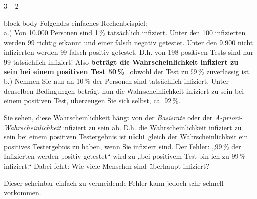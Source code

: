 \documentclass{beamer}
\begin{document}
\begin{frame}[t]
\begin{textblock*}{3\colwidth + 2\colsep}
\begin{alertblock}
\begin{minipage}{\textwidth}
\begin{beamercolorbox}[
			ht = 24.5cm, 
			wd = \linewidth, 
			left
		]{block body}
			\vspace{0.3cm}
		Folgendes einfaches Rechenbeispiel:\\
		a.)	Von 10.000 Personen sind 1\,\% tatsächlich infiziert. Unter den 100 infizierten werden 99 richtig erkannt und einer falsch negativ getestet. Unter den 9.900 nicht infizierten werden 99 falsch positiv getestet. D.h. von 198 positiven Tests sind nur 99 tatsächlich infiziert! Also \textbf{beträgt die Wahrscheinlichkeit infiziert zu sein bei einem positiven Test 50\,\%\ } obwohl der Test zu 99\,\% zuverlässig ist. \\
		b.)	Nehmen Sie nun an 10\,\% der Personen sind tatsächlich infiziert. Unter denselben Bedingungen beträgt nun die Wahrscheinlichkeit infiziert zu sein bei einem positiven Test, überzeugen Sie sich selbst, ca. 92\,\%. 

		\vspace{0.5cm}
		Sie sehen, diese Wahrscheinlichkeit hängt von der \textit{Basisrate} oder der \textit{A-priori-Wahrscheinlichkeit} infiziert zu sein ab. D.h. die Wahrscheinlichkeit infiziert zu sein bei einem positiven Testergebnis ist \textbf{nicht} gleich der Wahrscheinlichkeit ein positives Testergebnis zu haben, wenn Sie infiziert sind. Der Fehler: „99\,\% der Infizierten werden positiv getestet“ wird zu „bei positivem Test bin ich zu 99\,\% infiziert.“ Dabei fehlt: Wie viele Menschen sind überhaupt infiziert?
		
		\vspace{0.3cm}
		Dieser scheinbar einfach zu vermeidende Fehler kann jedoch sehr schnell vorkommen.
		\end{beamercolorbox}
	\end{minipage}%
	\vspace{0.5cm}
\end{alertblock}

\end{textblock*}


\end{frame}
\end{document}

